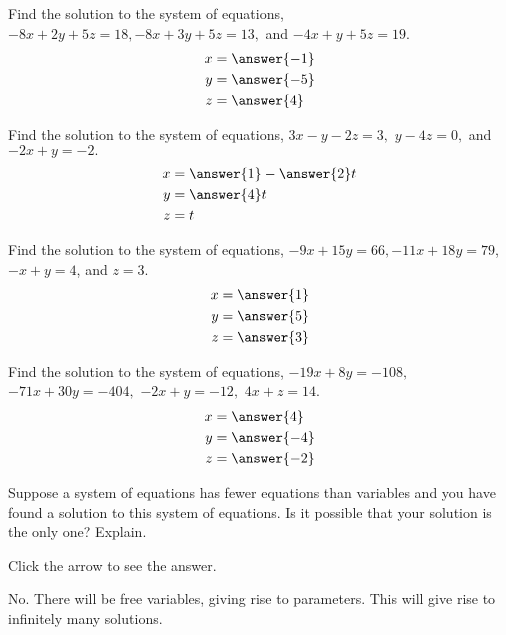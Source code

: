 \documentclass{ximera}
\begin{document}
\begin{problem}\label{prb:2.35} Find the solution to the system of equations,
$-8x+2y+5z=18,-8x+3y+5z=13,$ and $-4x+y+5z=19.$
 \begin{align*}
 x&=\answer{-1}\\
 y&=\answer{-5}\\
 z&=\answer{4}\\
 \end{align*}
\end{problem}

\begin{problem}\label{prb:2.36} Find the solution to the system of equations, $3x-y-2z=3,$
$y-4z=0,$ and $-2x+y=-2.$
 \begin{align*}
 x&=\answer{1}-\answer{2}t\\
 y&=\answer{4}t\\
 z&=t\\
 \end{align*}
\end{problem}

\begin{problem}\label{prb:2.37} Find the solution to the system of equations,
$-9x+15y=66,-11x+18y=79$, $-x+y=4$, and $z=3$.
 \begin{align*}
 x&=\answer{1}\\
 y&=\answer{5}\\
 z&=\answer{3}\\
 \end{align*}
\end{problem}

\begin{problem}\label{prb:2.38} Find the solution to the system of equations, $-19x+8y=-108,$
$-71x+30y=-404,$ $-2x+y=-12,$ $4x+z=14.$
 \begin{align*}
 x&=\answer{4}\\
 y&=\answer{-4}\\
 z&=\answer{-2}\\
 \end{align*}
\end{problem}

\begin{problem}\label{prb:2.39} Suppose a system of equations has fewer equations than variables and
you have found a solution to this system of equations. Is it possible that
your solution is the only one? Explain.

Click the arrow to see the answer. 
\begin{expandable}
No. There will be free variables, giving rise to parameters.  This will give rise to infinitely many solutions.
\end{expandable}
\end{problem}
\end{document}
